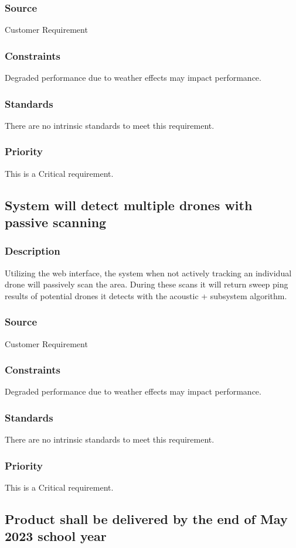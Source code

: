 \subsubsection{Source}
Customer Requirement
\subsubsection{Constraints}
Degraded performance due to weather effects may impact performance.
\subsubsection{Standards}
There are no intrinsic standards to meet this requirement.
\subsubsection{Priority}
This is a Critical requirement.

\subsection{System will detect multiple drones with passive scanning}
\subsubsection{Description}
Utilizing the web interface, the system when not actively tracking an individual drone will passively scan the area. During these scans it will return sweep ping results of potential drones it detects with the acoustic + subsystem algorithm.
\subsubsection{Source}
Customer Requirement
\subsubsection{Constraints}
Degraded performance due to weather effects may impact performance.
\subsubsection{Standards}
There are no intrinsic standards to meet this requirement.
\subsubsection{Priority}
This is a Critical requirement.

\subsection{Product shall be delivered by the end of May 2023 school year}
